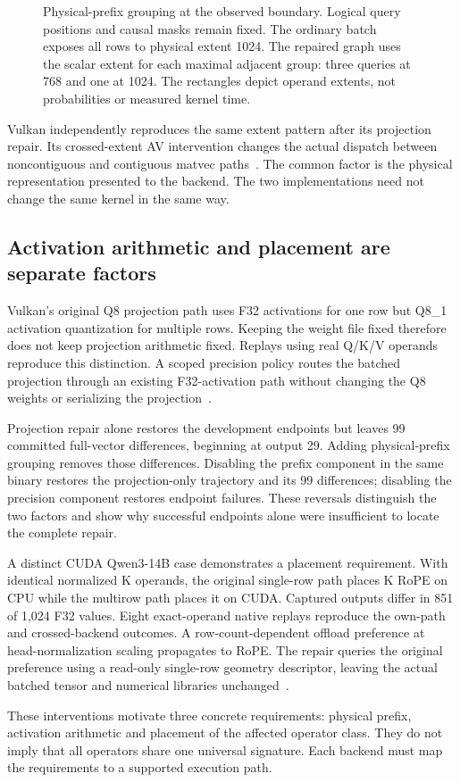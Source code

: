 \begin{figure}[t]
\centering
\caption{Physical-prefix grouping at the observed boundary. Logical query positions and causal masks remain fixed. The ordinary batch exposes all rows to physical extent 1024. The repaired graph uses the scalar extent for each maximal adjacent group: three queries at 768 and one at 1024. The rectangles depict operand extents, not probabilities or measured kernel time.}
\label{fig:prefix}
\end{figure}

Vulkan independently reproduces the same extent pattern after its projection repair. Its crossed-extent AV intervention changes the actual dispatch between noncontiguous and contiguous matvec paths~\cite{b570llamarepair}. The common factor is the physical representation presented to the backend. The two implementations need not change the same kernel in the same way.

\subsection{Activation arithmetic and placement are separate factors}
\label{sec:arithmetic}
Vulkan's original Q8 projection path uses F32 activations for one row but Q8\_1 activation quantization for multiple rows. Keeping the weight file fixed therefore does not keep projection arithmetic fixed. Replays using real Q/K/V operands reproduce this distinction. A scoped precision policy routes the batched projection through an existing F32-activation path without changing the Q8 weights or serializing the projection~\cite{b570llamarepair}.

Projection repair alone restores the development endpoints but leaves 99 committed full-vector differences, beginning at output 29. Adding physical-prefix grouping removes those differences. Disabling the prefix component in the same binary restores the projection-only trajectory and its 99 differences; disabling the precision component restores endpoint failures. These reversals distinguish the two factors and show why successful endpoints alone were insufficient to locate the complete repair.

A distinct CUDA Qwen3-14B case demonstrates a placement requirement. With identical normalized K operands, the original single-row path places K RoPE on CPU while the multirow path places it on CUDA. Captured outputs differ in 851 of 1,024 F32 values. Eight exact-operand native replays reproduce the own-path and crossed-backend outcomes. A row-count-dependent offload preference at head-normalization scaling propagates to RoPE. The repair queries the original preference using a read-only single-row geometry descriptor, leaving the actual batched tensor and numerical libraries unchanged~\cite{rtxqwenrepair}.

These interventions motivate three concrete requirements: physical prefix, activation arithmetic and placement of the affected operator class. They do not imply that all operators share one universal signature. Each backend must map the requirements to a supported execution path.
